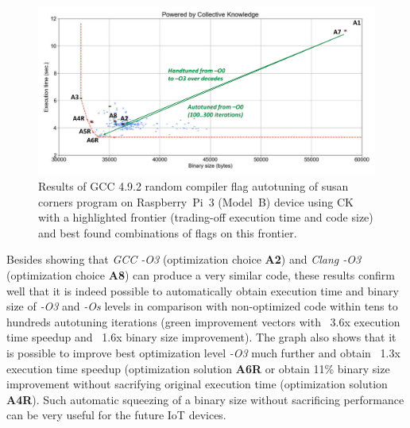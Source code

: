  \begin{figure}[!htbp]
    \centering
     \includegraphics[width=6.9in]
     {ck-assets/4373f49dea7663db-cropped.pdf} %
     \vspace{0.1in}
     \vspace{0.1in}
    \caption{
      Results of GCC 4.9.2 random compiler flag autotuning of susan corners program on Raspberry~Pi~3 (Model~B) 
      device using CK with a highlighted frontier (trading-off execution time and code size) 
      and best found combinations of flags on this frontier.
    }
    \label{fig:autotuning-susan-gcc4}
  \end{figure}

Besides showing that \textit{GCC -O3} (optimization choice \textbf{A2})
and \textit{Clang -O3} (optimization choice \textbf{A8}) can produce a very similar code, 
these results confirm well that it is indeed possible to automatically obtain execution time 
and binary size of \textit{-O3} and \textit{-Os} levels in comparison with non-optimized code 
within tens to hundreds autotuning iterations (green improvement vectors with ~3.6x execution time speedup 
and ~1.6x binary size improvement).
%
The graph also shows that it is possible to improve best optimization level \textit{-O3} 
much further and obtain ~1.3x execution time speedup (optimization solution \textbf{A6R}
or obtain 11\% binary size improvement without sacrifying original execution time
(optimization solution \textbf{A4R}).
%
Such automatic squeezing of a binary size without sacrificing performance 
can be very useful for the future IoT devices.

